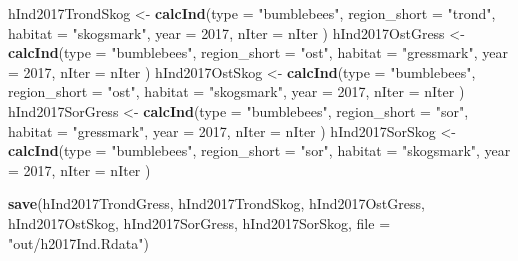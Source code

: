 \documentclass[]{article}
\newenvironment{Shaded}{\begin{snugshade}}{\end{snugshade}}
\newcommand{\KeywordTok}[1]{\textcolor[rgb]{0.13,0.29,0.53}{\textbf{#1}}}
\newcommand{\DataTypeTok}[1]{\textcolor[rgb]{0.13,0.29,0.53}{#1}}
\newcommand{\DecValTok}[1]{\textcolor[rgb]{0.00,0.00,0.81}{#1}}
\newcommand{\StringTok}[1]{\textcolor[rgb]{0.31,0.60,0.02}{#1}}
\newcommand{\NormalTok}[1]{#1}
\begin{document}
\begin{Shaded}
\begin{Highlighting}[]
\NormalTok{hInd2017TrondSkog <-}\StringTok{ }\KeywordTok{calcInd}\NormalTok{(}\DataTypeTok{type =} \StringTok{"bumblebees"}\NormalTok{,}
                              \DataTypeTok{region_short =} \StringTok{"trond"}\NormalTok{,}
                              \DataTypeTok{habitat =} \StringTok{"skogsmark"}\NormalTok{,}
                              \DataTypeTok{year =} \DecValTok{2017}\NormalTok{,}
                              \DataTypeTok{nIter =}\NormalTok{ nIter}
\NormalTok{                              )}
\NormalTok{hInd2017OstGress <-}\StringTok{ }\KeywordTok{calcInd}\NormalTok{(}\DataTypeTok{type =} \StringTok{"bumblebees"}\NormalTok{,}
                              \DataTypeTok{region_short =} \StringTok{"ost"}\NormalTok{,}
                              \DataTypeTok{habitat =} \StringTok{"gressmark"}\NormalTok{,}
                              \DataTypeTok{year =} \DecValTok{2017}\NormalTok{,}
                              \DataTypeTok{nIter =}\NormalTok{ nIter}
\NormalTok{                              )}
\NormalTok{hInd2017OstSkog <-}\StringTok{ }\KeywordTok{calcInd}\NormalTok{(}\DataTypeTok{type =} \StringTok{"bumblebees"}\NormalTok{,}
                              \DataTypeTok{region_short =} \StringTok{"ost"}\NormalTok{,}
                              \DataTypeTok{habitat =} \StringTok{"skogsmark"}\NormalTok{,}
                              \DataTypeTok{year =} \DecValTok{2017}\NormalTok{,}
                              \DataTypeTok{nIter =}\NormalTok{ nIter}
\NormalTok{                              )}
\NormalTok{hInd2017SorGress <-}\StringTok{ }\KeywordTok{calcInd}\NormalTok{(}\DataTypeTok{type =} \StringTok{"bumblebees"}\NormalTok{,}
                              \DataTypeTok{region_short =} \StringTok{"sor"}\NormalTok{,}
                              \DataTypeTok{habitat =} \StringTok{"gressmark"}\NormalTok{,}
                              \DataTypeTok{year =} \DecValTok{2017}\NormalTok{,}
                              \DataTypeTok{nIter =}\NormalTok{ nIter}
\NormalTok{                              )}
\NormalTok{hInd2017SorSkog <-}\StringTok{ }\KeywordTok{calcInd}\NormalTok{(}\DataTypeTok{type =} \StringTok{"bumblebees"}\NormalTok{,}
                              \DataTypeTok{region_short =} \StringTok{"sor"}\NormalTok{,}
                              \DataTypeTok{habitat =} \StringTok{"skogsmark"}\NormalTok{,}
                              \DataTypeTok{year =} \DecValTok{2017}\NormalTok{,}
                              \DataTypeTok{nIter =}\NormalTok{ nIter}
\NormalTok{                              )}

\KeywordTok{save}\NormalTok{(hInd2017TrondGress, hInd2017TrondSkog, hInd2017OstGress, hInd2017OstSkog, hInd2017SorGress, hInd2017SorSkog, }\DataTypeTok{file =} \StringTok{"out/h2017Ind.Rdata"}\NormalTok{)}
\end{Highlighting}
\end{Shaded}
\end{document}
